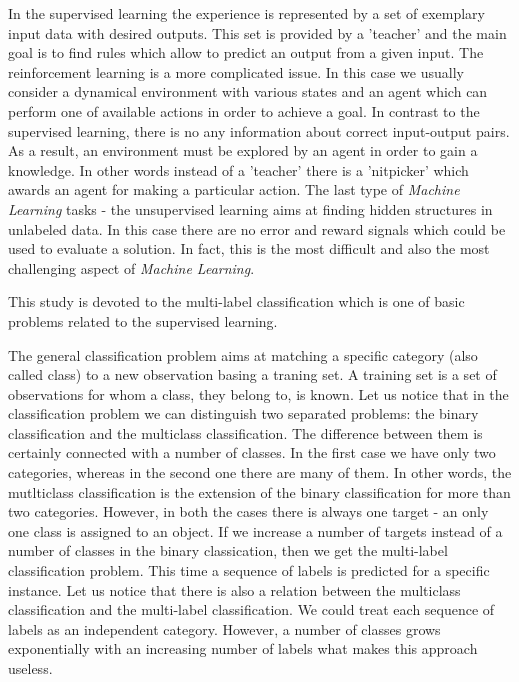 In the supervised learning the experience is represented by a set of exemplary input data with desired outputs. This set is provided by a 'teacher' and the main goal is to find rules which allow to predict an output from a given input. The reinforcement learning is a more complicated issue. In this case we usually consider a dynamical environment with various states and an agent which can perform one of available actions in order to achieve a goal. In contrast to the supervised learning, there is no any information about correct input-output pairs. As a result, an environment must be explored by an agent in order to gain a knowledge. In other words instead of a 'teacher' there is a 'nitpicker' which awards an agent for making a particular action. The last type of \textit{Machine Learning} tasks - the unsupervised learning aims at finding hidden structures in unlabeled data. In this case there are no error and reward signals which could be used to evaluate a solution. In fact, this is the most difficult and also the most challenging aspect of \textit{Machine Learning}. 

This study is devoted to the multi-label classification which is one of basic problems related to the supervised learning. 

The general classification problem aims at matching a specific category (also called class) to a new observation basing a traning set. A training set is a set of observations for whom a class, they belong to, is known. Let us notice that in the classification problem we can distinguish two separated problems: the binary classification and the multiclass classification. The difference between them is certainly connected with a number of classes. In the first case we have only two categories, whereas in the second one there are many of them. In other words, the mutlticlass classification is the extension of the binary classification for more than two categories. However, in both the cases there is always one target - an only one class is assigned to an object. If we increase a number of targets instead of a number of classes in the binary classication, then we get the multi-label classification problem. This time a sequence of labels is predicted for a specific instance. Let us notice that there is also a relation between the multiclass classification and the multi-label classification. We could treat each sequence of labels as an independent category. However, a number of classes grows exponentially with an increasing number of labels what makes this approach useless. 

